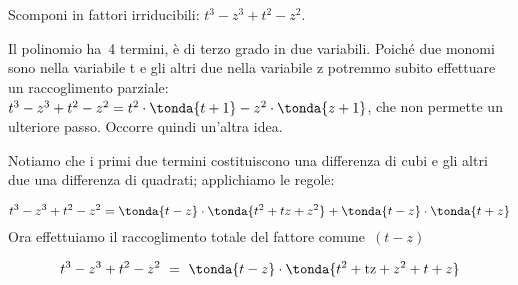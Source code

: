 \begin{esempio}{}{}
Scomponi in fattori irriducibili: \(t^{{3}}-z^{{3}}+t^{2}-z^{2}\).

Il polinomio ha~4 termini, è di terzo grado in due variabili.
Poiché due monomi sono nella variabile t e gli altri due nella
variabile z potremmo subito effettuare un raccoglimento
parziale:~\(t^{{3}}-z^{{3}}+t^{2}-z^{2}=
        t^{2}\cdot\tonda{t+1}-z^{2}\cdot \tonda{z+1}\),
che non permette un ulteriore passo. Occorre quindi un'altra idea.

Notiamo che i primi due termini costituiscono una differenza di cubi e
gli altri due una differenza di quadrati; applichiamo le regole:

\vspace{-1em}
\begin{equation*}
t^{{3}}-z^{{3}}+t^{2}-z^{2}=\tonda{t-z}\cdot
\tonda{t^{2}+tz+z^{2}}+\tonda{t-z}\cdot
\tonda{t+z}
\end{equation*}
Ora effettuiamo il raccoglimento totale del fattore comune~\((t-z)\)

\vspace{-1em}
\begin{equation*}
t^{3}-z^{3}+t^{2}-z^{2}\ =\ \tonda{t-z}\cdot
\tonda{t^{2}+{\text{tz}}+z^{2}+t+z}
\end{equation*}
\end{esempio}

